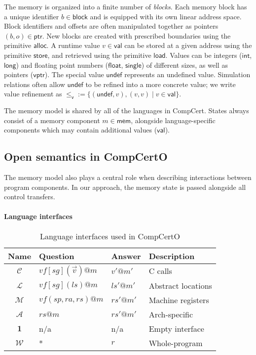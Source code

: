 \documentclass[sigplan,screen]{acmart}
\newcommand{\figsize}{\small}
\newcommand{\kw}[1]{\ensuremath{ \mathsf{#1} }}
\newcommand{\vref}{\le_\kw{v}}
\begin{document}
The memory is organized into a finite number of \emph{blocks}.
Each memory block has a unique identifier $b \in \kw{block}$
and is equipped with its own linear address space.
Block identifiers and offsets are often manipulated together
as pointers $(b, o) \in \kw{ptr}$.
New blocks are created with prescribed boundaries
using the primitive $\kw{alloc}$.
A runtime value $v \in \kw{val}$ can be stored at
a given address using the primitive \kw{store},
and retrieved using the primitive \kw{load}.
Values can be integers (\kw{int}, \kw{long}) and
floating point numbers (\kw{float}, \kw{single})
of different sizes,
as well as pointers (\kw{vptr}).
The special value \kw{undef}
represents an undefined value.
Simulation relations
often allow $\kw{undef}$
to be refined into a more concrete value;
we write value refinement as
${\vref} := \{(\kw{undef}, v), (v, v) \mid v \in \kw{val}\}$.

The memory model is shared by all of the languages in CompCert.
States always consist of
a memory component $m \in \kw{mem}$,
alongside language-specific components
which may contain additional values ($\kw{val}$).



\subsection{Open semantics in CompCertO} \label{sec:sem:open} %

The memory model also plays a central role
when describing interactions between program components.
In our approach, %
the memory state is passed %
alongside all control transfers.

\paragraph{Language interfaces} %

\begin{table} %
  \caption{Language interfaces used in CompCertO}
  \label{tbl:li}
  \figsize
  \begin{tabular}{clll}
    \toprule
    Name & Question & Answer & Description \\
    \midrule
    $\mathcal{C}$ &
      $\mathit{vf}[\mathit{sg}](\vec{v})@m$ & $v'@m'$ &
      C calls \\
    $\mathcal{L}$ &
      $\mathit{vf}[\mathit{sg}](\mathit{ls})@m$ & $\mathit{ls}'@m'$ &
      Abstract locations \\
    $\mathcal{M}$ &
      $\mathit{vf}(\mathit{sp},\mathit{ra},\mathit{rs})@m$ & $\mathit{rs}'@m'$ &
      Machine registers \\
    $\mathcal{A}$ &
      $\mathit{rs}@m$ & $\mathit{rs}'@m'$ &
      Arch-specific \\
    $\mathbf{1}$ & n/a & n/a &
      Empty interface \\
    $\mathcal{W}$ & * & $r$ &
      Whole-program \\
    \bottomrule
  \end{tabular}
\end{table}
\end{document}
